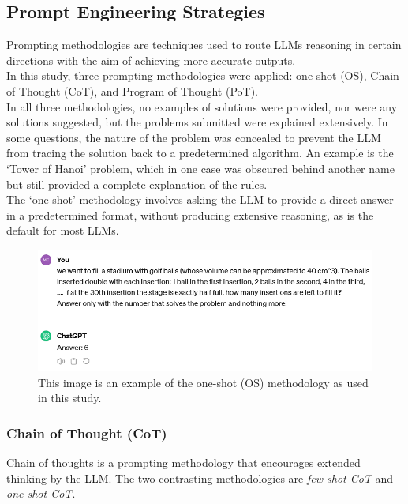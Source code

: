 \documentclass[12pt]{article}
\begin{document}
    \subsection{Prompt Engineering Strategies}
    Prompting methodologies are techniques used to route LLMs reasoning in certain directions with the aim of achieving more accurate outputs.\\
    In this study, three prompting methodologies were applied: one-shot (OS), Chain of Thought (CoT), and Program of Thought (PoT).\\
In all three methodologies, no examples of solutions were provided, nor were any solutions suggested, but the problems submitted were explained extensively. In some questions, the nature of the problem was concealed to prevent the LLM from tracing the solution back to a predetermined algorithm. An example is the ‘Tower of Hanoi’ problem, which in one case was obscured behind another name but still provided a complete explanation of the rules.\\
The ‘one-shot’ methodology involves asking the LLM to provide a direct answer in a predetermined format, without producing extensive reasoning, as is the default for most LLMs.\\
    \begin{figure}[H]
    \centering
            \includegraphics[width=1\textwidth]{MyOneShot.png}
    \caption[Example of one-shot methodology as used]{This image is an example of the one-shot (OS) methodology as used in this study.}
    \end{figure} 
    
    \subsubsection{Chain of Thought (CoT)}
    Chain of thoughts is a prompting methodology that encourages extended thinking by the LLM.
The two contrasting methodologies are \textit{few-shot-CoT} and \textit{one-shot-CoT}.
    
\end{document}
